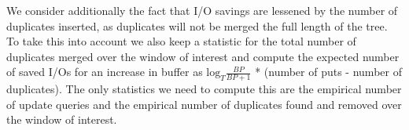 \documentclass{sig-alternate-05-2015}
\begin{document}
We consider additionally the fact that I/O savings are lessened by the number of duplicates inserted, as duplicates will not be merged the full length of the tree. To take this into account we also keep a statistic for the total number of duplicates merged over the window of interest and compute the expected number of saved I/Os for an increase in buffer as $\textrm{log}_{T} \frac{BP}{BP+1}$ * (number of puts - number of duplicates).
The only statistics we need to compute this are the empirical number of update queries and the empirical number of duplicates found and removed over the window of interest.
%
%
\end{document}
